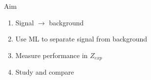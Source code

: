\documentclass[UKenglish]{beamer}
\begin{document}
\begin{frame}
    \centering
    \begin{block}{Aim}
        \begin{enumerate}
            \item Signal $\rightarrow$ background
            \item Use ML to separate signal from background
            \item Measure performance in $Z_{exp}$
            \item Study and compare
        \end{enumerate}
    \end{block}
\end{frame}
\end{document}
